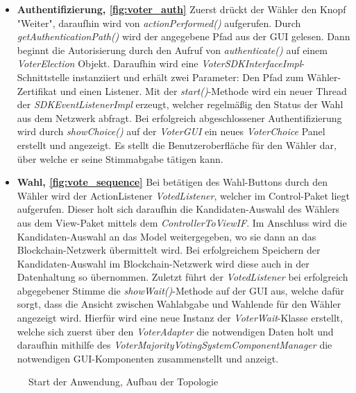 \documentclass[parskip=full]{scrartcl}
\newcommand{\fakeparagraph}[1]{\textbf{#1}}
\begin{document}
\begin{itemize}
	\item\fakeparagraph{Authentifizierung, \autoref{fig:voter_auth}} Zuerst drückt der Wähler den Knopf "Weiter", daraufhin wird von \textit{actionPerformed()} aufgerufen.
	Durch \textit{getAuthenticationPath()} wird der angegebene Pfad aus der GUI gelesen.
	Dann beginnt die Autorisierung durch den Aufruf von \textit{authenticate()} auf einem \textit{VoterElection} Objekt.
	Daraufhin wird eine \textit{VoterSDKInterfaceImpl}-Schnittstelle instanziiert und erhält zwei Parameter: Den Pfad zum Wähler-Zertifikat und einen Listener.
	Mit der \textit{start()}-Methode wird ein neuer Thread der \textit{SDKEventListenerImpl} erzeugt, welcher regelmäßig den Status der Wahl aus dem Netzwerk abfragt.
	Bei erfolgreich abgeschlossener Authentifizierung wird durch \textit{showChoice()} auf der \textit{VoterGUI} ein neues \textit{VoterChoice} Panel erstellt und angezeigt. Es stellt die Benutzeroberfläche für den Wähler dar, über welche er seine Stimmabgabe tätigen kann.
	
	\item\fakeparagraph{Wahl, \autoref{fig:vote_sequence} } Bei betätigen des Wahl-Buttons durch den Wähler wird der ActionListener \textit{VotedListener}, welcher im Control-Paket liegt aufgerufen. Dieser holt sich daraufhin die Kandidaten-Auswahl des Wählers aus dem View-Paket mittels dem \textit{ControllerToViewIF}. Im Anschluss wird die Kandidaten-Auswahl an das Model weitergegeben, wo sie dann an das Blockchain-Netzwerk übermittelt wird. Bei erfolgreichem Speichern der Kandidaten-Auswahl im Blockchain-Netzwerk wird diese auch in der Datenhaltung so übernommen. Zuletzt führt der \textit{VotedListener} bei erfolgreich abgegebener Stimme die \textit{showWait()}-Methode auf der GUI aus, welche dafür sorgt, dass die Ansicht zwischen Wahlabgabe und Wahlende für den Wähler angezeigt wird. Hierfür wird eine neue Instanz der \textit{VoterWait}-Klasse erstellt, welche sich zuerst über den \textit{VoterAdapter} die notwendigen Daten holt und daraufhin mithilfe des \textit{VoterMajorityVotingSystemComponentManager} die notwendigen GUI-Komponenten zusammenstellt und anzeigt.
	
	\end{itemize}
	\newpage
	\pagestyle{empty}
		\begin{figure}
		\centering
		\hspace{-100pt}
		\centerline{}
		\caption{Start der Anwendung, Aufbau der Topologie}
		\label{fig:main_thread}
	\end{figure}
\end{document}
